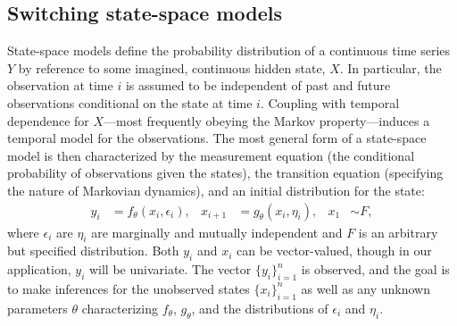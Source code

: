 \documentclass[aoas]{imsart}
\begin{document}
\subsection{Switching state-space models}

State-space models define the probability distribution of a continuous
time series $Y$ by reference to some imagined, continuous hidden state, $X$. In
particular, the observation at time $i$ is assumed to be
independent of past and future observations conditional on the state
at time $i$. Coupling with temporal dependence for $X$---most
frequently obeying the Markov property---induces a temporal model for
the observations.  The most general form of a state-space model is
then characterized by the 
measurement equation (the conditional probability of observations
given the states),
the transition equation (specifying the nature of Markovian
dynamics), and an initial distribution for the state: 
\begin{equation}
\begin{aligned}
  y_i &= f_\theta(x_i,\epsilon_i), &
  x_{i+1} &= g_\theta(x_i,\eta_i), &
  x_1 &\sim F,
\end{aligned}
\label{eq:ssmod}
\end{equation}
where $\epsilon_i$ are $\eta_i$ are marginally and mutually independent and $F$ is
an arbitrary but specified distribution. Both
$y_i$ and $x_i$ can be vector-valued, though in our
application, $y_i$ will be univariate. The
vector $\{y_i\}_{i=1}^n$ is observed, and the goal is to make
inferences for the unobserved states $\{x_i\}_{i=1}^n$ as well as any
unknown parameters $\theta$ characterizing $f_\theta$, $g_\theta$, and
the distributions of $\epsilon_i$ and $\eta_i$.
\end{document}
